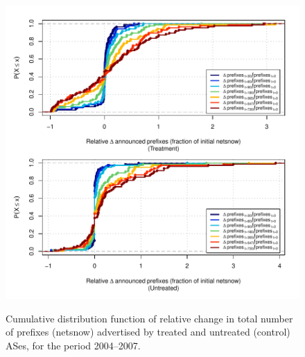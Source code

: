 \begin{figure}[H]
\begin{centering}
\begin{singlespace}
    \includegraphics[width=6in]{figures/behavior-rel_netsnow-2004_2007-corr.pdf}
    \vspace{-2em}\\
    \caption{Cumulative distribution function of relative change in total
    number of prefixes (netsnow) advertised by treated and untreated (control)
    ASes, for the period 2004--2007.}
\end{singlespace}
\end{centering}
\end{figure}
